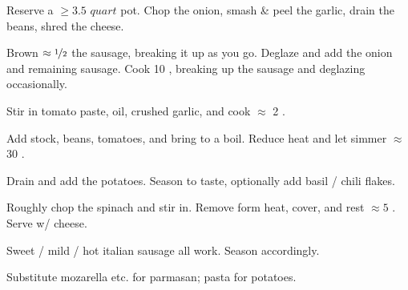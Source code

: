 \begin{preparation}
\item Reserve a $\ge 3.5$ $quart$ pot.
	Chop the onion, smash \& peel the garlic, drain the beans, shred the cheese.

\item Brown $\approx \nicefrac{1}{2}$ the sausage, breaking it up as you go.
	Deglaze and add the onion and remaining sausage.
	Cook 10 \minute, breaking up the sausage and deglazing occasionally.

\item Stir in tomato paste, oil, crushed garlic, and cook $\approx$ 2 \minute.

\item Add stock, beans, tomatoes, and bring to a boil.
	Reduce heat and let simmer $\approx$ 30 \minute.

\item Drain and add the potatoes.
	Season to taste, optionally add basil / chili flakes.

\item Roughly chop the spinach and stir in.
	Remove form heat, cover, and rest $\approx 5$ \minute.
	Serve w/ cheese.
\end{preparation}


\begin{variation}
\item Sweet / mild / hot italian sausage all work. Season accordingly.

\item Substitute mozarella etc. for parmasan; pasta for potatoes.
\end{variation}


\recipeend
